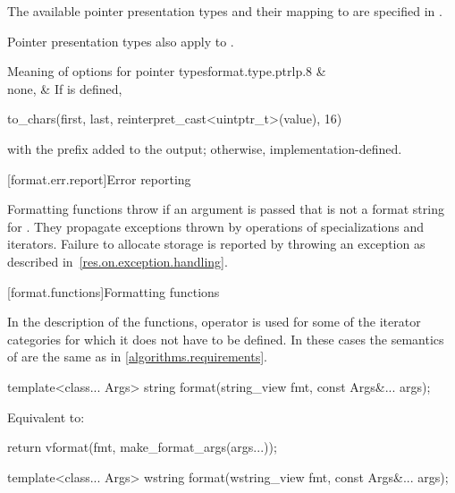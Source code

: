 \pnum
The available pointer presentation types and their mapping to
 are specified in .
\begin{note}
Pointer presentation types also apply to .
\end{note}

\begin{floattable}{Meaning of  options for pointer types}{format.type.ptr}{lp{.8\hsize}}
\topline
{} &  \\ \rowsep
none,  &
If  is defined,
\begin{codeblock}
to_chars(first, last, reinterpret_cast<uintptr_t>(value), 16)
\end{codeblock}
with the prefix  added to the output;
otherwise, implementation-defined.
\\
\end{floattable}

[format.err.report]{Error reporting}

\pnum
Formatting functions throw  if
an argument  is passed that
is not a format string for .
They propagate exceptions thrown by operations of
 specializations and iterators.
Failure to allocate storage is reported by
throwing an exception as described in~\ref{res.on.exception.handling}.

[format.functions]{Formatting functions}

\pnum
In the description of the functions, operator \tcode{+} is used
for some of the iterator categories for which it does not have to be defined.
In these cases the semantics of  are
the same as in \ref{algorithms.requirements}.

%
\begin{itemdecl}
template<class... Args>
  string format(string_view fmt, const Args&... args);
\end{itemdecl}

\begin{itemdescr}
\pnum
\effects
Equivalent to:
\begin{codeblock}
return vformat(fmt, make_format_args(args...));
\end{codeblock}
\end{itemdescr}

%
\begin{itemdecl}
template<class... Args>
  wstring format(wstring_view fmt, const Args&... args);
\end{itemdecl}

